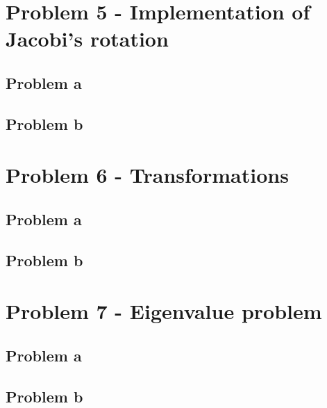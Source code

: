 \documentclass[english,notitlepage]{revtex4-1}  %
\begin{document}
\section*{Problem 5 - Implementation of Jacobi’s rotation }

\subsection*{Problem a}

\subsection*{Problem b}


\section*{Problem 6 - Transformations}

\subsection*{Problem a}

\subsection*{Problem b}


\section*{Problem 7 - Eigenvalue problem}

\subsection*{Problem a}

\subsection*{Problem b}
\end{document}
